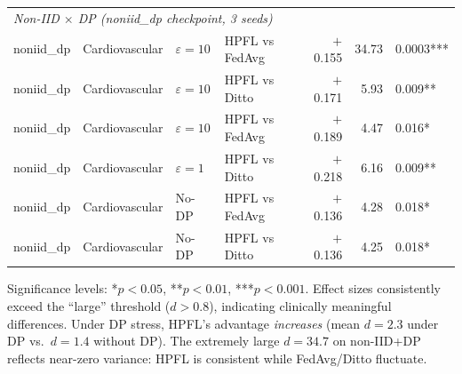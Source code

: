 \documentclass[conference,a4paper]{IEEEtran}
\begin{document}
\begin{table}[htbp]
\begin{tabular}{llllrrl}
\midrule
\multicolumn{7}{l}{\textit{Non-IID $\times$ DP (noniid\_dp checkpoint, 3 seeds)}} \\
noniid\_dp & Cardiovascular & $\varepsilon{=}10$ & HPFL vs FedAvg & $+$0.155 & 34.73 & 0.0003*** \\
noniid\_dp & Cardiovascular & $\varepsilon{=}10$ & HPFL vs Ditto & $+$0.171 & 5.93 & 0.009** \\
noniid\_dp & Cardiovascular & $\varepsilon{=}10$ & HPFL vs FedAvg & $+$0.189 & 4.47 & 0.016* \\
noniid\_dp & Cardiovascular & $\varepsilon{=}1$ & HPFL vs Ditto & $+$0.218 & 6.16 & 0.009** \\
noniid\_dp & Cardiovascular & No-DP & HPFL vs FedAvg & $+$0.136 & 4.28 & 0.018* \\
noniid\_dp & Cardiovascular & No-DP & HPFL vs Ditto & $+$0.136 & 4.25 & 0.018* \\
\bottomrule
\end{tabular}

\vspace{1mm}
\footnotesize{Significance levels: *$p{<}0.05$, **$p{<}0.01$, ***$p{<}0.001$. Effect sizes consistently exceed the ``large'' threshold ($d{>}0.8$), indicating clinically meaningful differences. Under DP stress, HPFL's advantage \textit{increases} (mean $d{=}2.3$ under DP vs.\ $d{=}1.4$ without DP). The extremely large $d{=}34.7$ on non-IID+DP reflects near-zero variance: HPFL is consistent while FedAvg/Ditto fluctuate.}
\end{table}

\end{document}
